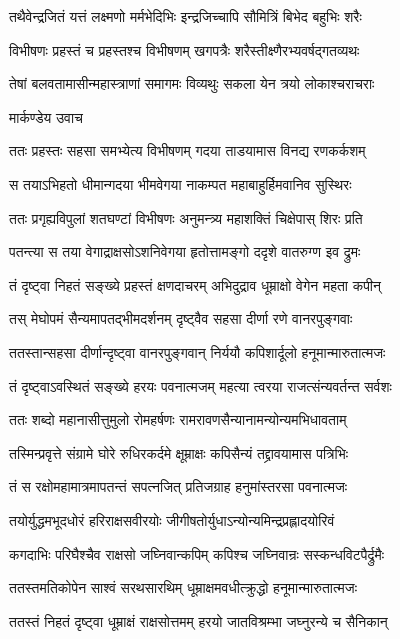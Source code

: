 \twolineshloka
{तथैवेन्द्रजितं यत्तं लक्ष्मणो मर्मभेदिभिः}
{इन्द्रजिच्चापि सौमित्रिं बिभेद बहुभिः शरैः}


\twolineshloka
{विभीषणः प्रहस्तं च प्रहस्तश्च विभीषणम्}
{खगपत्रैः शरैस्तीक्ष्णैरभ्यवर्षद्गतव्यथः}


\twolineshloka
{तेषां बलवतामासीन्महास्त्राणां समागमः}
{विव्यथुः सकला येन त्रयो लोकाश्चराचराः}


\twolineshloka
{मार्कण्डेय उवाच}
{}


\twolineshloka
{ततः प्रहस्तः सहसा समभ्येत्य विभीषणम्}
{गदया ताडयामास विनद्य रणकर्कशम्}


\twolineshloka
{स तयाऽभिहतो धीमान्गदया भीमवेगया}
{नाकम्पत महाबाहुर्हिमवानिव सुस्थिरः}


\twolineshloka
{ततः प्रगृह्यविपुलां शतघण्टां विभीषणः}
{अनुमन्त्र्य महाशक्तिं चिक्षेपास् शिरः प्रति}


\twolineshloka
{पतन्त्या स तया वेगाद्राक्षसोऽशनिवेगया}
{हृतोत्तामङ्गो ददृशे वातरुग्ण इव द्रुमः}


\twolineshloka
{तं दृष्ट्वा निहतं सङ्ख्ये प्रहस्तं क्षणदाचरम्}
{अभिदुद्राव धूम्राक्षो वेगेन महता कपीन्}


\twolineshloka
{तस् मेघोपमं सैन्यमापतद्भीमदर्शनम्}
{दृष्ट्वैव सहसा दीर्णा रणे वानरपुङ्गवाः}


\twolineshloka
{ततस्तान्सहसा दीर्णान्दृष्ट्वा वानरपुङ्गवान्}
{निर्ययौ कपिशार्दूलो हनूमान्मारुतात्मजः}


\twolineshloka
{तं दृष्ट्वाऽवस्थितं सङ्ख्ये हरयः पवनात्मजम्}
{महत्या त्वरया राजत्संन्यवर्तन्त सर्वशः}


\twolineshloka
{ततः शब्दो महानासीत्तुमुलो रोमहर्षणः}
{रामरावणसैन्यानामन्योन्यमभिधावताम्}


\twolineshloka
{तस्मिन्प्रवृत्ते संग्रामे घोरे रुधिरकर्दमे}
{क्षूम्राक्षः कपिसैन्यं तद्द्रावयामास पत्रिभिः}


\twolineshloka
{तं स रक्षोमहामात्रमापतन्तं सपत्नजित्}
{प्रतिजग्राह हनुमांस्तरसा पवनात्मजः}


\twolineshloka
{तयोर्युद्धमभूदधोरं हरिराक्षसवीरयोः}
{जीगीषतोर्युधाऽन्योन्यमिन्द्रप्रह्लादयोरिवं}


\twolineshloka
{कगदाभिः परिघैश्चैव राक्षसो जघ्निवान्कपिम्}
{कपिश्च जघ्निवान्रः सस्कन्धविटपैर्द्रुमैः}


\twolineshloka
{ततस्तमतिकोपेन साश्वं सरथसारथिम्}
{धूम्राक्षमवधीत्क्रुद्धो हनूमान्मारुतात्मजः}


\twolineshloka
{ततस्तं निहतं दृष्ट्वा धूम्राक्षं राक्षसोत्तमम्}
{हरयो जातविश्रम्भा जघ्नुरन्ये च सैनिकान्}


